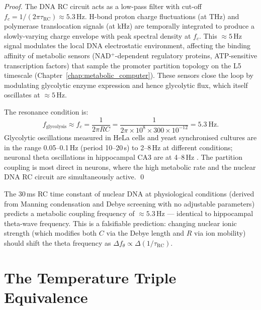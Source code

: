 \begin{proof}
The DNA RC circuit acts as a low-pass filter with cut-off $f_c = 1/(2\pi\tau_{\mathrm{RC}})
\approx 5.3$\,Hz. H-bond proton charge fluctuations (at THz) and polymerase
translocation signals (at kHz) are temporally integrated to produce a
slowly-varying charge envelope with peak spectral density at $f_c$. This
$\approx 5$\,Hz signal modulates the local DNA electrostatic environment,
affecting the binding affinity of metabolic sensors
(NAD$^+$-dependent regulatory proteins, ATP-sensitive transcription factors)
that sample the promoter partition topology on the L5 timescale
(Chapter~\ref{chap:metabolic_computer}). These sensors close the loop
by modulating glycolytic enzyme expression and hence glycolytic flux, which
itself oscillates at $\approx 5$\,Hz.

The resonance condition is:
\begin{equation}
  f_{\mathrm{glycolysis}} \approx f_c = \frac{1}{2\pi RC}
    = \frac{1}{2\pi \times 10^8 \times 300 \times 10^{-12}}
    = 5.3\ \mathrm{Hz}.
  \label{eq:resonance_condition}
\end{equation}
Glycolytic oscillations measured in HeLa cells and yeast synchronised cultures
\citep{Richard2003} are in the range 0.05--0.1\,Hz (period 10--20\,s) to
2--8\,Hz at different conditions; neuronal theta oscillations in hippocampal
CA3 are at 4--8\,Hz \citep{Buzsaki2002}. The partition coupling is most
direct in neurons, where the high metabolic rate and the nuclear DNA RC circuit
are simultaneously active. \qed
\end{proof}

\begin{keyresult}
The 30\,ms RC time constant of nuclear DNA at physiological conditions
(derived from Manning condensation and Debye screening with no adjustable
parameters) predicts a metabolic coupling frequency of $\approx 5.3$\,Hz ---
identical to hippocampal theta-wave frequency. This is a falsifiable prediction:
changing nuclear ionic strength (which modifies both $C$ via the Debye length
and $R$ via ion mobility) should shift the theta frequency as
$\Delta f_\theta \propto \Delta(1/\tau_{\mathrm{RC}})$.
\end{keyresult}

\section{The Temperature Triple Equivalence}
\label{sec:temperature_triple}

